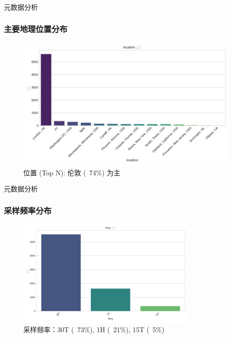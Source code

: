 \documentclass{beamer} %
\begin{document}
\begin{frame}{元数据分析}
    \frametitle{主要地理位置分布}
    \begin{figure}
        \centering
        \includegraphics[width=\textwidth]{../plots/metadata_dist_location.png}
        \caption{位置 (Top N): 伦敦 (~74\%) 为主}
    \end{figure}
\end{frame}

\begin{frame}{元数据分析}
    \frametitle{采样频率分布}
    \begin{figure}
        \centering
        \includegraphics[width=0.8\textwidth]{../plots/metadata_dist_freq.png}
        \caption{采样频率：30T (~73\%), 1H (~21\%), 15T (~5\%)}
    \end{figure}
\end{frame}
\end{document}
